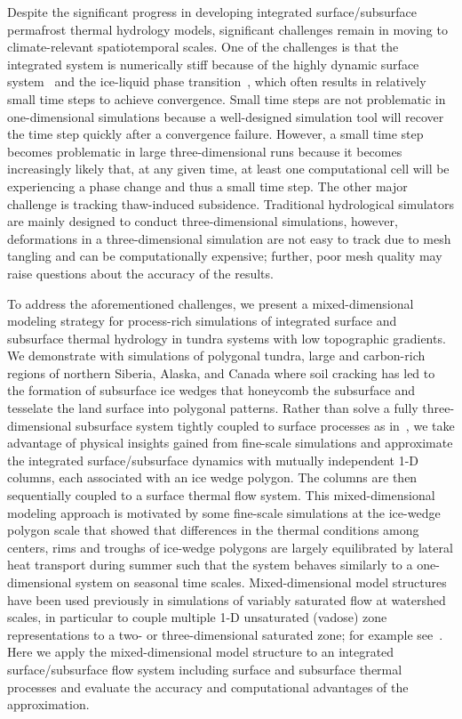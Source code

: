 \documentclass[review]{elsarticle}
\begin{document}
Despite the significant progress in developing integrated surface/subsurface permafrost thermal hydrology models, significant challenges remain in moving to climate-relevant spatiotemporal scales. One of the challenges is that the integrated system is numerically stiff because of the highly dynamic surface system~\cite{spainter2016integrated} and the ice-liquid phase transition~\cite{dall2011robust}, which often results in relatively small time steps to achieve convergence. Small time steps are not problematic in one-dimensional simulations because a well-designed simulation tool will recover the time step quickly after a convergence failure. However, a small time step becomes problematic in large three-dimensional runs because it becomes increasingly likely that, at any given time, at least one computational cell will be experiencing a phase change and thus a small time step. The other major challenge is tracking thaw-induced subsidence. Traditional hydrological simulators are mainly designed to conduct three-dimensional simulations, however, deformations in a three-dimensional simulation are not easy to track due to mesh tangling and can be computationally expensive; further, poor mesh quality may raise questions about the accuracy of the results. 

To address the aforementioned challenges, we present a mixed-dimensional modeling strategy for process-rich simulations of integrated surface and subsurface thermal hydrology in tundra systems with low topographic gradients. We demonstrate with simulations of polygonal tundra, large and carbon-rich regions of northern Siberia, Alaska, and Canada where soil cracking has led to the formation of subsurface ice wedges that honeycomb the subsurface and tesselate the land surface into polygonal patterns. Rather than solve a fully three-dimensional subsurface system tightly coupled to surface processes as in~\cite{spainter2016integrated}, we take advantage of physical insights gained from fine-scale simulations and approximate the integrated surface/subsurface dynamics with mutually independent 1-D columns, each associated with an ice wedge polygon. The columns are then sequentially coupled to a surface thermal flow system. This mixed-dimensional modeling approach is motivated by some fine-scale simulations at the ice-wedge polygon scale that showed that differences in the thermal conditions among centers, rims and troughs of ice-wedge polygons are largely equilibrated by lateral heat transport during summer such that the system behaves similarly to a one-dimensional system on seasonal time scales. Mixed-dimensional model structures have been used previously in simulations of variably saturated flow at watershed scales, in particular to couple multiple 1-D unsaturated (vadose) zone representations to a two- or three-dimensional saturated zone; for example see~\cite{pikul1974numerical,zhu2011method,hybrid3D}. Here we apply the mixed-dimensional model structure to an integrated surface/subsurface flow system including surface and subsurface thermal processes and evaluate the accuracy and computational advantages of the approximation. 
\end{document}

